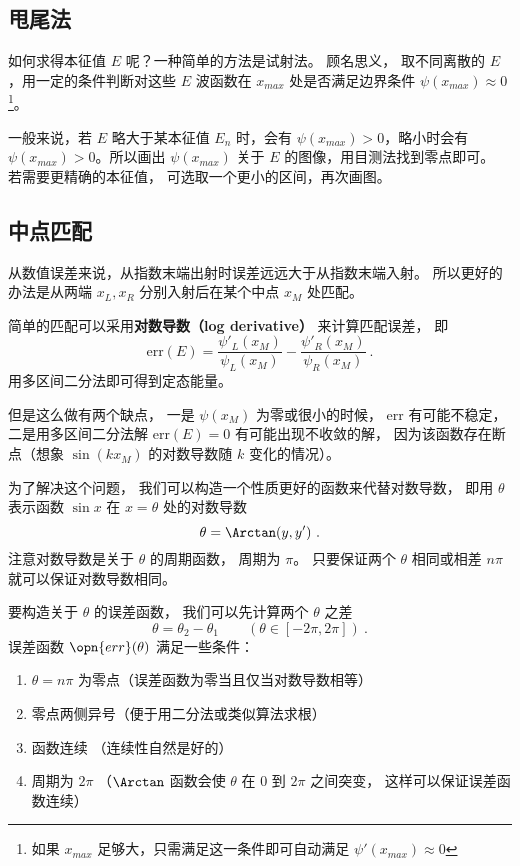 \subsection{甩尾法}
如何求得本征值 $E$ 呢？一种简单的方法是试射法。 顾名思义， 取不同离散的 $E$，用一定的条件判断对这些 $E$ 波函数在 $x_{max}$ 处是否满足边界条件 $\psi(x_{max}) \approx 0$\footnote{如果 $x_{max}$ 足够大，只需满足这一条件即可自动满足 $\psi'(x_{max})\approx 0$}。

一般来说，若 $E$ 略大于某本征值 $E_n$ 时，会有 $\psi(x_{max})>0$，略小时会有 $\psi(x_{max})>0$。所以画出 $\psi(x_{max})$ 关于 $E$ 的图像，用目测法找到零点即可。 若需要更精确的本征值， 可选取一个更小的区间，再次画图。

\subsection{中点匹配}
从数值误差来说，从指数末端出射时误差远远大于从指数末端入射。 所以更好的办法是从两端 $x_L, x_R$ 分别入射后在某个中点 $x_M$ 处匹配。

简单的匹配可以采用\textbf{对数导数（log derivative）} 来计算匹配误差， 即
\begin{equation}
\text{err}(E) = \frac{\psi'_L(x_M)}{\psi_L(x_M)} - \frac{\psi'_R(x_M)}{\psi_R(x_M)}~.
\end{equation}
用多区间二分法即可得到定态能量。

但是这么做有两个缺点， 一是 $\psi(x_M)$ 为零或很小的时候， err 有可能不稳定， 二是用多区间二分法解 $\text{err}(E) = 0$ 有可能出现不收敛的解， 因为该函数存在断点（想象 $\sin(k x_M)$ 的对数导数随 $k$ 变化的情况）。

为了解决这个问题， 我们可以构造一个性质更好的函数来代替对数导数， 即用 $\theta$ 表示函数 $\sin x$ 在 $x = \theta$ 处的对数导数
\begin{equation}
\theta = \Arctan(y, y')~.
\end{equation}
注意对数导数是关于 $\theta$ 的周期函数， 周期为 $\pi$。 只要保证两个 $\theta$ 相同或相差 $n\pi$ 就可以保证对数导数相同。

要构造关于 $\theta$ 的误差函数， 我们可以先计算两个 $\theta$ 之差
\begin{equation}
\theta = \theta_2 - \theta_1 \qquad (\theta \in [-2\pi, 2\pi])~.
\end{equation}
误差函数 $\opn{err}(\theta)$ 满足一些条件：
\begin{enumerate}
\item $\theta = n\pi$ 为零点（误差函数为零当且仅当对数导数相等）
\item 零点两侧异号（便于用二分法或类似算法求根）
\item 函数连续 （连续性自然是好的）
\item 周期为 $2\pi$ （$\Arctan$ 函数会使 $\theta$ 在 0 到 $2\pi$ 之间突变， 这样可以保证误差函数连续）
\end{enumerate}

